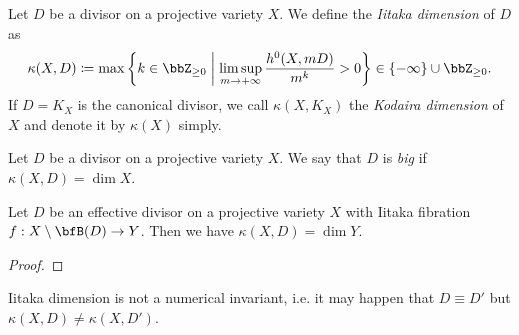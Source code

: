   \begin{definition}
    Let $D$ be a divisor on a projective variety $X$.
    We define the \emph{Iitaka dimension} of $D$ as
    \[ \kappa(X, D) \coloneqq \max \left\{ k \in \bbZ_{\geq 0} \;\middle|\; \limsup_{m \to +\infty} \frac{h^0(X, mD)}{m^k} > 0 \right\} \in \{-\infty\} \cup \bbZ_{\geq 0}. \]
    If $D = K_X$ is the canonical divisor, we call $\kappa(X, K_X)$ the \emph{Kodaira dimension} of $X$ and denote it by $\kappa(X)$ simply.
  \end{definition}

  \begin{definition}
    Let $D$ be a divisor on a projective variety $X$.
    We say that $D$ is \emph{big} if $\kappa(X, D) = \dim X$.
  \end{definition} 

  \begin{proposition}
    Let $D$ be an effective divisor on a projective variety $X$ with Iitaka fibration $f: X \setminus \bfB(D) \to Y$.
    Then we have $\kappa(X, D) = \dim Y$.
  \end{proposition}
  \begin{proof}
    \Yang{}
  \end{proof}

  \begin{remark}
    Iitaka dimension is not a numerical invariant, i.e. it may happen that $D \equiv D'$ but $\kappa(X, D) \neq \kappa(X, D')$.
  \end{remark}








